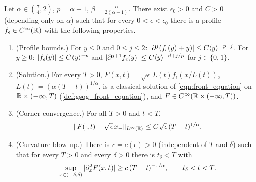 \begin{theorem}
  \label{thm:main}
  Let $\alpha\in(\frac74,2)$, $p=\alpha-1$, $\beta=\frac{\alpha}{2(\alpha-1)}$.  There exist
  $\epsilon_0>0$ and $C>0$ (depending only on $\alpha$) such that for every
  $0<\epsilon<\epsilon_0$ there is a profile $f_\epsilon\in C^\infty(\mathbb{R})$ with the following
  properties.
  \begin{enumerate}
    \item (Profile bounds.) For $y\le0$ and $0\le j\le2$:
      $|\partial^j(f_\epsilon(y)+y)|\le C\langle y \rangle^{-p-j}$.  For $y\ge0$:
      $|f_\epsilon(y)|\le C\langle y \rangle^{-p}$ and $|\partial^{j+1}f_\epsilon(y)|\le C\langle y \rangle^{-\beta+j/p}$ for
      $j\in\{0,1\}$.
    \item (Solution.) For every $T>0$, $F(x,t)=\sqrt\epsilon\,L(t)f_\epsilon(x/L(t))$,
      $L(t)=(\alpha(T-t))^{1/\alpha}$, is a classical solution of \eqref{eqn:front_equation}
      on $\mathbb{R}\times(-\infty,T)$ (\cref{def:gsqg_front_equation}), and $F\in C^\infty(\mathbb{R}\times(-\infty,T))$.
    \item (Corner convergence.) For all $T>0$ and $t<T$,
      \begin{equation}\label{eqn:intro_corner_convergence}
        \|F(\cdot,t)-\sqrt\epsilon\,x_-\|_{L^\infty(\mathbb{R})}\le C\sqrt\epsilon\,(T-t)^{1/\alpha}.
      \end{equation}
    \item (Curvature blow-up.) There is $c=c(\epsilon)>0$ (independent of $T$ and $\delta$) such
      that for every $T>0$ and every $\delta>0$ there is $t_\delta<T$ with
      \begin{equation}\label{eqn:intro_curvature_blowup}
        \sup_{x\in(-\delta,\delta)}|\partial_x^2F(x,t)|\ge c\,(T-t)^{-1/\alpha},\qquad t_\delta<t<T.
      \end{equation}
  \end{enumerate}
\end{theorem}
